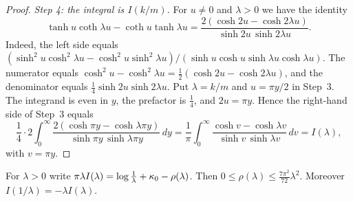 \begin{proof}
\emph{Step 4: the integral is $I(k/m)$.} For $u\ne0$ and $\lambda>0$ we have the identity
\begin{equation}\label{eq:tanh-identity}
\tanh u\coth\lambda u-\coth u\tanh\lambda u=\frac{2(\cosh2u-\cosh2\lambda u)}{\sinh2u\,\sinh2\lambda u}.
\end{equation}
Indeed, the left side equals $(\sinh^2u\cosh^2\lambda u-\cosh^2u\sinh^2\lambda u)/(\sinh u\cosh u\sinh\lambda u\cosh\lambda u)$. The numerator equals $\cosh^2u-\cosh^2\lambda u=\frac12(\cosh2u-\cosh2\lambda u)$, and the denominator equals $\frac14\sinh2u\sinh2\lambda u$. Put $\lambda=k/m$ and $u=\pi y/2$ in Step~3. The integrand is even in $y$, the prefactor is $\frac14$, and $2u=\pi y$. Hence the right-hand side of Step~3 equals
\[
\frac14\cdot2\int_0^\infty\frac{2(\cosh\pi y-\cosh\lambda\pi y)}{\sinh\pi y\,\sinh\lambda\pi y}\,dy=\frac1\pi\int_0^\infty\frac{\cosh v-\cosh\lambda v}{\sinh v\,\sinh\lambda v}\,dv=I(\lambda),
\]
with $v=\pi y$.
\end{proof}

\begin{lemma}\label{lem:I-asymptotics}
For $\lambda>0$ write $\pi\lambda I(\lambda)=\log\frac1\lambda+\kappa_0-\rho(\lambda)$. Then $0\le\rho(\lambda)\le\frac{7\pi^2}{72}\lambda^2$. Moreover $I(1/\lambda)=-\lambda I(\lambda)$.
\end{lemma}

